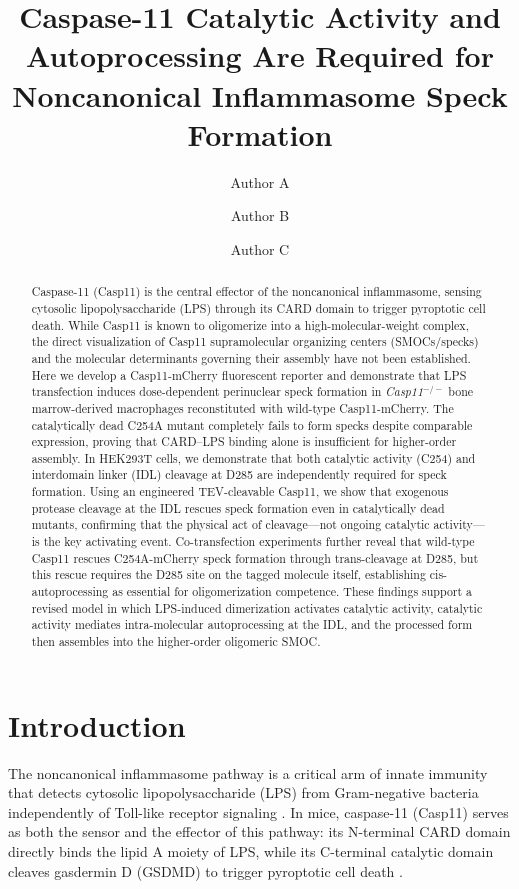 \documentclass[11pt,a4paper]{article}
\title{Caspase-11 Catalytic Activity and Autoprocessing Are Required for Noncanonical Inflammasome Speck Formation}
\author[1]{Author A}
\author[1]{Author B}
\author[1,2]{Author C}
\affil[1]{Department of Immunology, Harvard Medical School, Boston, MA, USA}
\affil[2]{Corresponding author: \texttt{author.c@hms.harvard.edu}}
\date{}
\begin{document}
\maketitle

\begin{abstract}
Caspase-11 (Casp11) is the central effector of the noncanonical inflammasome, sensing cytosolic lipopolysaccharide (LPS) through its CARD domain to trigger pyroptotic cell death. While Casp11 is known to oligomerize into a high-molecular-weight complex, the direct visualization of Casp11 supramolecular organizing centers (SMOCs/specks) and the molecular determinants governing their assembly have not been established. Here we develop a Casp11-mCherry fluorescent reporter and demonstrate that LPS transfection induces dose-dependent perinuclear speck formation in \textit{Casp11$^{-/-}$} bone marrow-derived macrophages reconstituted with wild-type Casp11-mCherry. The catalytically dead C254A mutant completely fails to form specks despite comparable expression, proving that CARD--LPS binding alone is insufficient for higher-order assembly. In HEK293T cells, we demonstrate that both catalytic activity (C254) and interdomain linker (IDL) cleavage at D285 are independently required for speck formation. Using an engineered TEV-cleavable Casp11, we show that exogenous protease cleavage at the IDL rescues speck formation even in catalytically dead mutants, confirming that the physical act of cleavage---not ongoing catalytic activity---is the key activating event. Co-transfection experiments further reveal that wild-type Casp11 rescues C254A-mCherry speck formation through trans-cleavage at D285, but this rescue requires the D285 site on the tagged molecule itself, establishing cis-autoprocessing as essential for oligomerization competence. These findings support a revised model in which LPS-induced dimerization activates catalytic activity, catalytic activity mediates intra-molecular autoprocessing at the IDL, and the processed form then assembles into the higher-order oligomeric SMOC.
\end{abstract}

\section{Introduction}

The noncanonical inflammasome pathway is a critical arm of innate immunity that detects cytosolic lipopolysaccharide (LPS) from Gram-negative bacteria independently of Toll-like receptor signaling \citep{Shi2014, Kayagaki2011, Hagar2013}. In mice, caspase-11 (Casp11) serves as both the sensor and the effector of this pathway: its N-terminal CARD domain directly binds the lipid A moiety of LPS, while its C-terminal catalytic domain cleaves gasdermin D (GSDMD) to trigger pyroptotic cell death \citep{Shi2015, Kayagaki2015, Aglietti2016}.
\end{document}
